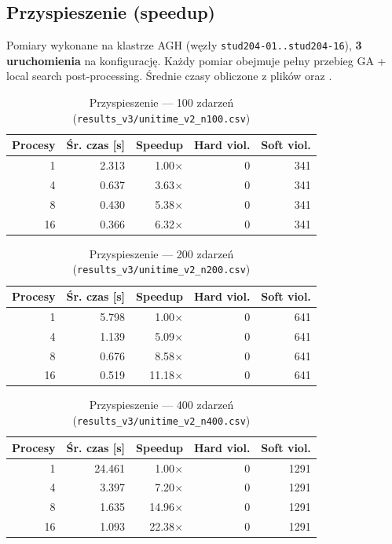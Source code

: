 \documentclass{common/sprawozdanie-agh}
\begin{document}
\subsection{Przyspieszenie (speedup)}

Pomiary wykonane na klastrze AGH (węzły \texttt{stud204-01..stud204-16}), \textbf{3 uruchomienia} na konfigurację. Każdy pomiar obejmuje pełny przebieg GA + local search post-processing. Średnie czasy obliczone z plików  oraz .

\begin{table}[H]
\centering
\begin{tabular}{rrrrr}
\toprule
\textbf{Procesy} & \textbf{Śr. czas [s]} & \textbf{Speedup} & \textbf{Hard viol.} & \textbf{Soft viol.} \\
\midrule
1  & 2.313 & 1.00$\times$  & 0 & 341 \\
4  & 0.637 & 3.63$\times$  & 0 & 341 \\
8  & 0.430 & 5.38$\times$  & 0 & 341 \\
16 & 0.366 & 6.32$\times$  & 0 & 341 \\
\bottomrule
\end{tabular}
\caption{Przyspieszenie --- 100 zdarzeń (\texttt{results\_v3/unitime\_v2\_n100.csv})}
\label{tab:speedup100}
\end{table}

\begin{table}[H]
\centering
\begin{tabular}{rrrrr}
\toprule
\textbf{Procesy} & \textbf{Śr. czas [s]} & \textbf{Speedup} & \textbf{Hard viol.} & \textbf{Soft viol.} \\
\midrule
1  & 5.798 & 1.00$\times$  & 0 & 641 \\
4  & 1.139 & 5.09$\times$  & 0 & 641 \\
8  & 0.676 & 8.58$\times$  & 0 & 641 \\
16 & 0.519 & 11.18$\times$ & 0 & 641 \\
\bottomrule
\end{tabular}
\caption{Przyspieszenie --- 200 zdarzeń (\texttt{results\_v3/unitime\_v2\_n200.csv})}
\label{tab:speedup200}
\end{table}

\begin{table}[H]
\centering
\begin{tabular}{rrrrr}
\toprule
\textbf{Procesy} & \textbf{Śr. czas [s]} & \textbf{Speedup} & \textbf{Hard viol.} & \textbf{Soft viol.} \\
\midrule
1  & 24.461 & 1.00$\times$   & 0 & 1291 \\
4  &  3.397 & 7.20$\times$   & 0 & 1291 \\
8  &  1.635 & 14.96$\times$  & 0 & 1291 \\
16 &  1.093 & 22.38$\times$  & 0 & 1291 \\
\bottomrule
\end{tabular}
\caption{Przyspieszenie --- 400 zdarzeń (\texttt{results\_v3/unitime\_v2\_n400.csv})}
\label{tab:speedup400}
\end{table}
\end{document}
